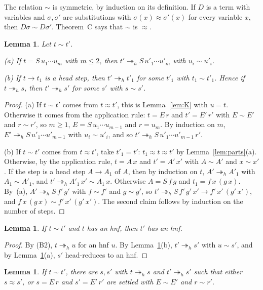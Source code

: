 \documentclass[11pt]{amsart}
\newtheorem{lemma}[theorem]{Lemma}
\theoremstyle{definition}
\newcommand{\hred}{\twoheadrightarrow_h}
\newcommand{\cg}{\sim}
\begin{document}
The relation $\cg$ is symmetric, by induction on its definition. If $D$ is a term with variables and
$\sigma,\sigma'$ are substitutions with $\sigma(x)\approx\sigma'(x)$ for every variable $x$, then
$D\sigma\cg D\sigma'$. Theorem~C says that $\cg$ is $\approx$.

\begin{lemma}\label{lem:sim}
Let $t\cg t'$.

\textup{(a)} If $t=S\,u_1\cdots u_m$ with $m\le2$, then $t'\hred S\,u'_1\cdots u'_m$ with $u_i\cg u'_i$.

\textup{(b)} If $t\to t_1$ is a head step, then $t'\hred t'_1$ for some $t'_1$ with $t_1\cg t'_1$.
Hence if $t\hred s$, then $t'\hred s'$ for some $s'$ with $s\cg s'$.
\end{lemma}

\begin{proof}
(a) If $t\cg t'$ comes from $t\approx t'$, this is Lemma~\ref{lem:K} with $u=t$. Otherwise it comes
from the application rule: $t=E\,r$ and $t'=E'\,r'$ with
$E\cg E'$ and $r\cg r'$, so $m\ge1$, $E=S\,u_1\cdots u_{m-1}$ and $r=u_m$. By induction on $m$,
$E'\hred S\,u'_1\cdots u'_{m-1}$ with $u_i\cg u'_i$, and so $t'\hred S\,u'_1\cdots u'_{m-1}\,r'$.

(b) If $t\cg t'$ comes from $t\approx t'$, take $t'_1=t'$: $t_1\approx t\approx t'$ by
Lemma~\ref{lem:parts}(a). Otherwise, by the application rule, $t=A\,x$ and $t'=A'\,x'$ with $A\cg A'$ and $x\cg x'$. If the step is a head step $A\to A_1$ of $A$,
then by induction on $t$, $A'\hred A'_1$ with $A_1\cg A'_1$, and $t'\hred A'_1\,x'\cg A_1\,x$. Otherwise
$A=S\,f\,g$ and $t_1=f\,x\,(g\,x)$. By~(a), $A'\hred S\,f'\,g'$ with $f\cg f'$ and $g\cg g'$, so
$t'\hred S\,f'\,g'\,x'\to f'\,x'\,(g'\,x')$, and $f\,x\,(g\,x)\cg f'\,x'\,(g'\,x')$. The second claim
follows by induction on the number of steps.
\end{proof}

\begin{lemma}\label{lem:fold}
If $t\cg t'$ and $t$ has an hnf, then $t'$ has an hnf.
\end{lemma}

\begin{proof}
By (B2), $t\hred u$ for an hnf $u$. By Lemma~\ref{lem:sim}(b), $t'\hred s'$ with $u\cg s'$, and by
Lemma~\ref{lem:sim}(a), $s'$ head-reduces to an hnf.
\end{proof}

\begin{lemma}\label{lem:split}
If $t\cg t'$, there are $s,s'$ with $t\hred s$ and $t'\hred s'$ such that either $s\approx s'$, or
$s=E\,r$ and $s'=E'\,r'$ are settled with $E\cg E'$ and $r\cg r'$.
\end{lemma}
\end{document}
